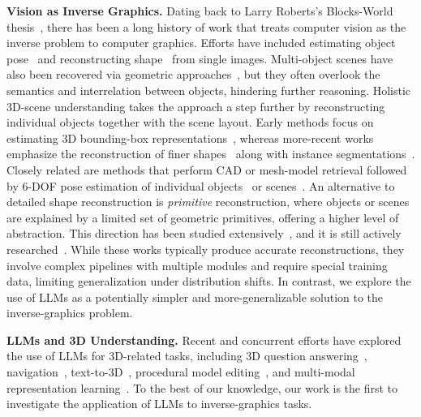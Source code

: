 \noindent\textbf{Vision as Inverse Graphics.}
Dating back to Larry Roberts's Blocks-World thesis~\citep{roberts1963machine}, there has been a long history of work that treats computer vision as the inverse problem to computer graphics. 
Efforts have included estimating object pose~\citep{lepetit2009ep, tejani2014latent, pavlakos20176dof, xiang2017posecnn, wang2021gdr, wang2019normalized, wang2021NeMo, ma2022robust, labbe2020cosypose} and reconstructing shape~\citep{choy20163d, fan2017point, groueix2018papier, mescheder2019occupancy, wang2018pixel2mesh, sitzmann2019scene,park2019deepsdf} from single images.
Multi-object scenes have also been recovered via geometric approaches~\citep{gkioxari2019mesh,denninger20203d, shin20193d}, but they often overlook the semantics and interrelation between objects, hindering further reasoning.
Holistic 3D-scene understanding takes the approach a step further by reconstructing individual objects together with the scene layout.
Early methods focus on estimating 3D bounding-box representations~\citep{hedau2009recovering,lee2009geometric,mallya2015learning,ren2017coarse, dasgupta2016delay}, whereas more-recent works emphasize the reconstruction of finer shapes~\citep{zhang2021holistic, liu2022towards, gkioxari2022learning}
along with instance segmentations~\citep{kundu2022panoptic, yao20183d, dahnert2021panoptic, nie2020total3dunderstanding, zhang2023uni, nie2023learning}.
Closely related are methods that perform CAD or mesh-model retrieval followed by 6-DOF pose estimation of individual objects~\citep{aubry2014seeing,bansal2016marr,lim2014fpm, tulsiani2015viewpoints} or scenes~\citep{izadinia2017im2cad,huang2018holistic, salas2013slam,kundu20183d,gumeli2022roca,kuo2020mask2cad,kuo2021patch2cad,engelmann2021points}.
An alternative to detailed shape reconstruction is \emph{primitive} reconstruction, where objects or scenes are explained by a limited set of geometric primitives, offering a higher level of abstraction.
This direction has been studied extensively~\citep{roberts1963machine,binford1975visual, hedau2009recovering, gupta2010blocks,gupta2010estimating}, and it is still actively researched~\citep{van2015part, tulsiani2017learning, paschalidou2019superquadrics, paschalidou2020learning, paschalidou2021neuralparts, deng2020cvxnet, kluger2021cuboids,monnier2023dbw,vavilala2023convex}.
While these works typically produce accurate reconstructions, they involve complex pipelines with multiple modules and require special training data, limiting generalization under distribution shifts.
In contrast, we explore the use of LLMs as a potentially simpler and more-generalizable solution to the inverse-graphics problem.

\noindent\textbf{LLMs and 3D Understanding.}
Recent and concurrent efforts have explored the use of LLMs for 3D-related tasks, including 3D question answering~\citep{hong2023_3D_LLM, dwedari2023generating}, navigation~\citep{hong2023_3D_LLM,zhang2023building}, text-to-3D~\citep{sun2023_3D_GPT}, procedural model editing~\citep{kodnongbua23reparamCAD}, and multi-modal representation learning~\citep{xue2023ulip, hong2023_3D_LLM}.
To the best of our knowledge, our work is the first to investigate the application of LLMs to inverse-graphics tasks.